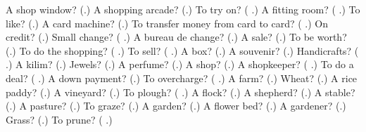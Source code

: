 \begin{tcolorbox}[breakable,colback=teal!4,colframe=teal!35!black,title={Before you move on}]
A shop window? (\textbf{}.) A shopping arcade? (\textbf{}.) To try on? (\textbf{ }.) A fitting room? (\textbf{ }.) To like? (\textbf{}.) A card machine? (\textbf{}.) To transfer money from card to card? (\textbf{   }.) On credit? (\textbf{}.) Small change? (\textbf{ }.) A bureau de change? (\textbf{}.) A sale? (\textbf{}.) To be worth? (\textbf{}.) To do the shopping? (\textbf{ }.) To sell? (\textbf{ }.) A box? (\textbf{}.) A souvenir? (\textbf{}.) Handicrafts? (\textbf{ }.) A kilim? (\textbf{}.) Jewels? (\textbf{}.) A perfume? (\textbf{}.) A shop? (\textbf{}.) A shopkeeper? (\textbf{ }.) To do a deal? (\textbf{ }.) A down payment? (\textbf{}.) To overcharge? (\textbf{ }.) A farm? (\textbf{}.) Wheat? (\textbf{}.) A rice paddy? (\textbf{}.) A vineyard? (\textbf{}.) To plough? (\textbf{ }.) A flock? (\textbf{}.) A shepherd? (\textbf{}.) A stable? (\textbf{}.) A pasture? (\textbf{}.) To graze? (\textbf{}.) A garden? (\textbf{}.) A flower bed? (\textbf{}.) A gardener? (\textbf{}.) Grass? (\textbf{}.) To prune? (\textbf{ }.)
\end{tcolorbox}
